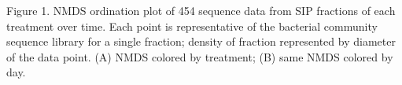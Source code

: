 Figure 1. NMDS ordination plot of 454 sequence data from SIP fractions of each treatment over time. Each point is representative of the bacterial community sequence library for a single fraction; density of fraction represented by diameter of the data point. (A) NMDS colored by treatment; (B) same NMDS colored by day.